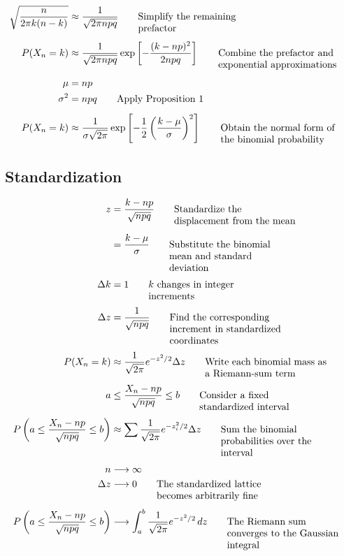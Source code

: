 \documentclass{article}
\newcommand{\justwidth}{0.36\textwidth}
\newcommand{\just}[1]{\parbox[t]{\justwidth}{\raggedright #1}}
\begin{document}
\begin{align*}
\\[0.45em]
\sqrt{\frac{n}{2\pi k(n-k)}}
&\approx
\frac{1}{\sqrt{2\pi npq}}
\tag*{\just{Simplify the remaining prefactor}}
\\[0.45em]
P(X_n=k)
&\approx
\frac{1}{\sqrt{2\pi npq}}
\exp\left[
-\frac{(k-np)^2}{2npq}
\right]
\tag*{\just{Combine the prefactor and exponential approximations}}
\\[0.45em]
\mu
&=
np
\\
\sigma^2
&=
npq
\tag*{\just{Apply Proposition 1}}
\\[0.45em]
P(X_n=k)
&\approx
\frac{1}{\sigma\sqrt{2\pi}}
\exp\left[
-\frac{1}{2}
\left(
\frac{k-\mu}{\sigma}
\right)^2
\right]
\tag*{\just{Obtain the normal form of the binomial probability}}
\end{align*}

\subsection{Standardization}
\begin{align*}
z
&=
\frac{k-np}{\sqrt{npq}}
\tag*{\just{Standardize the displacement from the mean}}
\\[0.45em]
&=
\frac{k-\mu}{\sigma}
\tag*{\just{Substitute the binomial mean and standard deviation}}
\\[0.45em]
\Delta k
&=
1
\tag*{\just{$k$ changes in integer increments}}
\\[0.45em]
\Delta z
&=
\frac{1}{\sqrt{npq}}
\tag*{\just{Find the corresponding increment in standardized coordinates}}
\\[0.45em]
P(X_n=k)
&\approx
\frac{1}{\sqrt{2\pi}}
e^{-z^2/2}
\Delta z
\tag*{\just{Write each binomial mass as a Riemann-sum term}}
\\[0.45em]
a
&\leq
\frac{X_n-np}{\sqrt{npq}}
\leq
b
\tag*{\just{Consider a fixed standardized interval}}
\\[0.45em]
P\left(
a
\leq
\frac{X_n-np}{\sqrt{npq}}
\leq
b
\right)
&\approx
\sum
\frac{1}{\sqrt{2\pi}}
e^{-z_i^2/2}
\Delta z
\tag*{\just{Sum the binomial probabilities over the interval}}
\\[0.45em]
n
&\longrightarrow
\infty
\\
\Delta z
&\longrightarrow
0
\tag*{\just{The standardized lattice becomes arbitrarily fine}}
\\[0.45em]
P\left(
a
\leq
\frac{X_n-np}{\sqrt{npq}}
\leq
b
\right)
&\longrightarrow
\int_a^b
\frac{1}{\sqrt{2\pi}}
e^{-z^2/2}
\,dz
\tag*{\just{The Riemann sum converges to the Gaussian integral}}
\end{align*}
\end{document}
